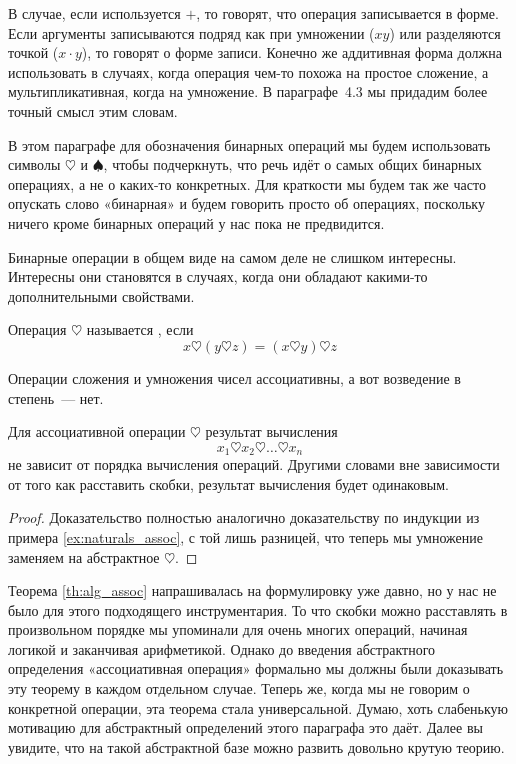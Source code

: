 В случае, если используется $+$, то говорят, что операция записывается в  форме. Если аргументы записываются подряд как при умножении ($xy$) или разделяются точкой ($x\cdot y$), то говорят о  форме записи. Конечно же аддитивная форма должна использовать в случаях, когда операция чем-то похожа на простое сложение, а мультипликативная, когда на умножение. В параграфе~4.3 мы придадим более точный смысл этим словам.

В этом параграфе для обозначения бинарных операций мы будем использовать символы $\heartsuit$ и $\spadesuit$, чтобы подчеркнуть, что речь идёт о самых общих бинарных операциях, а не о каких-то конкретных. Для краткости мы будем так же часто опускать слово «бинарная» и будем говорить просто об операциях, поскольку ничего кроме бинарных операций у нас пока не предвидится.

Бинарные операции в общем виде на самом деле не слишком интересны. Интересны они становятся в случаях, когда они обладают какими-то дополнительными свойствами.

\begin{definition}
Операция $\heartsuit$ называется , если
$$x\heartsuit(y\heartsuit z) = (x\heartsuit y)\heartsuit z$$
\end{definition}

\begin{example}
Операции сложения и умножения чисел ассоциативны, а вот возведение в степень~— нет.
\end{example}

\begin{thm}\label{th:alg_assoc}
Для ассоциативной операции $\heartsuit$ результат вычисления
$$x_1\heartsuit x_2\heartsuit\ldots\heartsuit x_n$$
не зависит от порядка вычисления операций. Другими словами вне зависимости от того как расставить скобки, результат вычисления будет одинаковым.
\end{thm}
\begin{proof}
Доказательство полностью аналогично доказательству по индукции из примера \ref{ex:naturals_assoc}, с той лишь разницей, что теперь мы умножение заменяем на абстрактное $\heartsuit$.
\end{proof}

Теорема \ref{th:alg_assoc} напрашивалась на формулировку уже давно, но у нас не было для этого подходящего инструментария. То что скобки можно расставлять в произвольном порядке мы упоминали для очень многих операций, начиная логикой и заканчивая арифметикой. Однако до введения абстрактного определения «ассоциативная операция» формально мы должны были доказывать эту теорему в каждом отдельном случае. Теперь же, когда мы не говорим о конкретной операции, эта теорема стала универсальной. Думаю, хоть слабенькую мотивацию для абстрактный определений этого параграфа это даёт. Далее вы увидите, что на такой абстрактной базе можно развить довольно крутую теорию.

